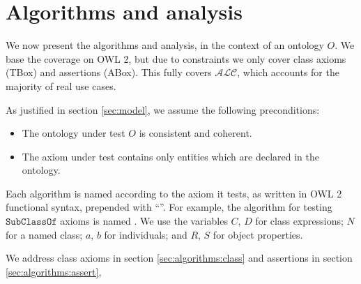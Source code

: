 \documentclass[paper.tex]{subfiles}
\begin{document}
\section{Algorithms and analysis}
\label{sec:algorithms}

We now present the algorithms and analysis, in the context of an ontology $O$.  We base the coverage on OWL 2, but due to constraints we only cover class axioms (TBox) and assertions (ABox).  This fully covers $\mathcal{ALC}$, which accounts for the majority of real use cases.

As justified in section \ref{sec:model}, we assume the following preconditions:
\begin{itemize}[nosep]
  \item The ontology under test $O$ is consistent and coherent.
  \item The axiom under test contains only entities which are declared in the ontology.
\end{itemize}

Each algorithm is named according to the axiom it tests, as written in OWL 2 functional syntax, prepended with ``''.  For example, the algorithm for testing $\mathtt{SubClassOf}$ axioms is named .  We use the variables $C$, $D$ for class expressions; $N$ for a named class; $a$, $b$ for individuals; and $R$, $S$ for object properties.

We address class axioms in section \ref{sec:algorithms:class} and assertions in section \ref{sec:algorithms:assert},




\end{document}
